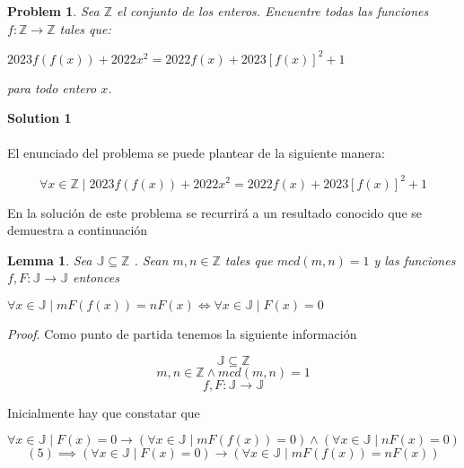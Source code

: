 \documentclass[12pt]{article}
\newtheorem{lemma}{Lemma}
\newtheorem*{problem}{Problem}
\begin{document}
\begin{problem}
Sea $\mathbb{Z}$ el conjunto de los enteros. Encuentre todas las funciones $f : \mathbb{Z} \to \mathbb{Z}$ tales que:

\begin{center}
	$2023 f(f(x)) + 2022x^2 = 2022 f(x) + 2023 [f(x)]^2 + 1$
\end{center}

para todo entero $x$.
\end{problem}

\noindent\textbf{Solution 1}\\\\
El enunciado del problema se puede plantear de la siguiente manera:

\begin{equation}
	\forall x \in \mathbb{Z} \mid 2023 f(f(x)) + 2022x^2 = 2022 f(x) + 2023 [f(x)]^2 + 1
\end{equation}

En la solución de este problema se recurrirá a un resultado conocido que se demuestra a continuación 

\begin{lemma}
	Sea $\mathbb{J} \subseteq \mathbb{Z}$ . Sean $m, n \in \mathbb{Z}$ tales que $mcd(m, n) = 1$ y las funciones $f, F : \mathbb{J} \to \mathbb{J}$ entonces
	
	$\forall x \in \mathbb{J} \mid m F(f(x)) = n  F(x) \iff \forall x \in \mathbb{J} \mid F(x) = 0$
\end{lemma}
\textit{Proof}. 
Como punto de partida tenemos la siguiente información

\begin{equation}
	\mathbb{J} \subseteq \mathbb{Z}
\end{equation}
\begin{equation}
	m, n \in \mathbb{Z} \land mcd(m, n) = 1
\end{equation}
\begin{equation}
	f, F : \mathbb{J} \to \mathbb{J}
\end{equation}

Inicialmente hay que constatar que 

\begin{equation}
	\forall x \in \mathbb{J} \mid F(x) = 0 \to (\forall x \in \mathbb{J} \mid m F(f(x)) = 0) \land (\forall x \in \mathbb{J} \mid n F(x) = 0)
\end{equation}
\begin{equation}
	(5) \implies  (\forall x \in \mathbb{J} \mid F(x) = 0) \to (\forall x \in \mathbb{J} \mid m F(f(x)) = n  F(x))
\end{equation}
\end{document}
